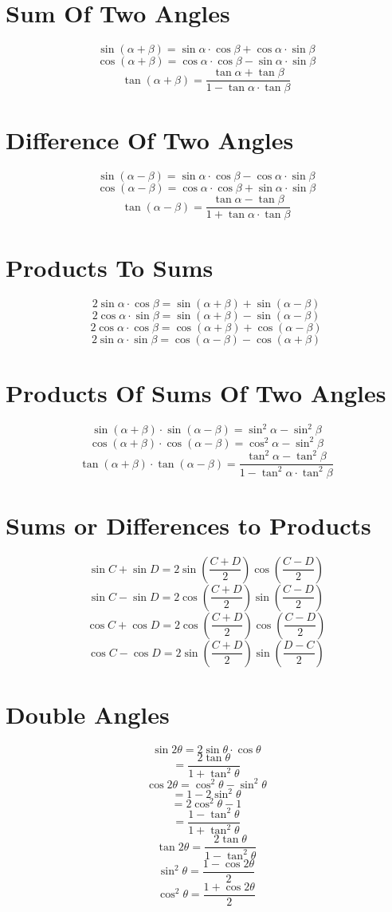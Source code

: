 \documentclass[fleqn, a4paper]{article}
\begin{document}
\section{Sum Of Two Angles}
\[\sin(\alpha+\beta) = \sin\alpha\cdot\cos\beta + \cos\alpha\cdot\sin\beta\]
\[\cos(\alpha+\beta) = \cos\alpha\cdot\cos\beta - \sin\alpha\cdot\sin\beta\]
\[\tan(\alpha+\beta) = \frac{\tan\alpha + \tan\beta}{1 - \tan\alpha\cdot\tan\beta}\]

\section{Difference Of Two Angles}
\[\sin(\alpha-\beta) = \sin\alpha\cdot\cos\beta - \cos\alpha\cdot\sin\beta\]
\[\cos(\alpha-\beta) = \cos\alpha\cdot\cos\beta + \sin\alpha\cdot\sin\beta\]
\[\tan(\alpha-\beta) = \frac{\tan\alpha - \tan\beta}{1 + \tan\alpha\cdot\tan\beta}\]

\section{Products To Sums}
\[2\sin\alpha\cdot\cos\beta = \sin(\alpha+\beta) + \sin(\alpha-\beta)\]
\[2\cos\alpha\cdot\sin\beta = \sin(\alpha+\beta) - \sin(\alpha-\beta)\]
\[2\cos\alpha\cdot\cos\beta = \cos(\alpha+\beta) + \cos(\alpha-\beta)\]
\[2\sin\alpha\cdot\sin\beta = \cos(\alpha-\beta) - \cos(\alpha+\beta)\]

\section{Products Of Sums Of Two Angles}
\[\sin(\alpha+\beta)\cdot\sin(\alpha-\beta) = \sin^2\alpha - \sin^2\beta\]
\[\cos(\alpha+\beta)\cdot\cos(\alpha-\beta) = \cos^2\alpha - \sin^2\beta\]
\[\tan(\alpha+\beta)\cdot\tan(\alpha-\beta) = \frac{\tan^2\alpha - \tan^2\beta}{1 - \tan^2\alpha\cdot\tan^2\beta}\]

\section{Sums or Differences to Products}
\[\sin C + \sin D = 2\sin\left(\frac{C+D}{2}\right)\cos\left(\frac{C-D}{2}\right)\]
\[\sin C - \sin D = 2\cos\left(\frac{C+D}{2}\right)\sin\left(\frac{C-D}{2}\right)\]
\[\cos C + \cos D = 2\cos\left(\frac{C+D}{2}\right)\cos\left(\frac{C-D}{2}\right)\]
\[\cos C - \cos D = 2\sin\left(\frac{C+D}{2}\right)\sin\left(\frac{D-C}{2}\right)\]

\section{Double Angles}
\[\sin2\theta = 2\sin\theta\cdot\cos\theta\]
\[ = \frac{2\tan\theta}{1 + \tan^2\theta}\]
\[\]
\[\cos2\theta = \cos^2\theta - \sin^2\theta\]
\[ = 1 - 2\sin^2\theta\]
\[ = 2\cos^2\theta - 1\]
\[ = \frac{1 - \tan^2\theta}{1 + \tan^2\theta}\]
\[\]
\[\tan2\theta = \frac{2\tan\theta}{1 - \tan^2\theta}\]
\[\]
\[\sin^2\theta = \frac{1 - \cos2\theta}{2}\]
\[\cos^2\theta = \frac{1 + \cos2\theta}{2}\]
\end{document}
